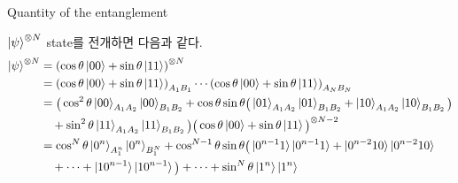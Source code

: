 \documentclass[9pt]{beamer}
\begin{document}
\begin{section}{Quantity of the entanglement}
\begin{frame}
            \vspace{0.4cm}
            $\ket{\psi}^{\otimes N}$ state를 전개하면 다음과 같다.
            \begin{align*}
                \ket{\psi}^{\otimes N} & = \scriptsize \left(\cos \theta \ket{00} + \sin \theta \ket{11} \right)^{\otimes N} \\
                & =  \scriptsize  \left(\cos \theta \ket{00} + \sin \theta \ket{11} \right)_{A_1B_1} \cdots \left(\cos \theta \ket{00} + \sin \theta \ket{11} \right)_{A_NB_N} \\
                & = \scriptsize   \Big(\cos^2 \theta \ket{00}_{A_1A_2} \ket{00}_{B_1B_2} + \cos\theta \sin \theta \big(\ket{01}_{A_1A_2}\ket{01}_{B_1B_2} + \ket{10}_{A_1A_2} \ket{10}_{B_1B_2}\big) \\ 
                &\quad  \scriptsize  + \sin^2 \theta \ket{11}_{A_1A_2} \ket{11}_{B_1B_2} \Big) \Big( \cos \theta \ket{00} + \sin \theta \ket{11}\Big)^{\otimes N-2} \\
                & = \scriptsize  \cos^N\theta \ket{0^n}_{A_1^n} \ket{0^n}_{B_1^N} + \cos^{N-1} \theta \sin \theta \Big(  \ket{0^{n-1} 1}\ket{0^{n-1} 1} + \ket{0^{n-2}10} \ket{0^{n-2}10}\\
                &\quad  \scriptsize  + \cdots + \ket{10^{n-1}} \ket{10^{n-1}}\Big) + \cdots + \sin^N \theta \ket{1^n} \ket{1^n}
            \end{align*}
        \end{frame}



\end{section}
\end{document}
